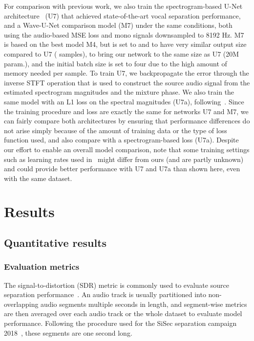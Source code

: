 \documentclass{article}
\begin{document}
For comparison with previous work, we also train the spectrogram-based U-Net architecture~\cite{Jansson2017} (U7) that achieved state-of-the-art vocal separation performance, and a Wave-U-Net comparison model (M7) under the same conditions, both using the audio-based MSE loss and mono signals downsampled to 8192 Hz.
M7 is based on the best model M4, but is set to  and  to have very similar output size compared to U7 ( samples),  to bring our network to the same size as U7 (20M param.), and the initial batch size is set to four due to the high amount of memory needed per sample.
To train U7, we backpropagate the error through the inverse STFT operation that is used to construct the source audio signal from the estimated spectrogram magnitudes and the mixture phase.
We also train the same model with an L1 loss on the spectral magnitudes (U7a), following~\cite{Jansson2017}.
Since the training procedure and loss are exactly the same for networks U7 and M7, we can fairly compare both architectures by ensuring that performance differences do not arise simply because of the amount of training data or the type of loss function used, and also compare with a spectrogram-based loss (U7a).
Despite our effort to enable an overall model comparison, note that some training settings such as learning rates used in~\cite{Jansson2017} might differ from ours (and are partly unknown) and could provide better performance with U7 and U7a than shown here, even with the same dataset.

\section{Results}
\label{sec:results}

\subsection{Quantitative results}
\label{sec:results_quantitative}

\subsubsection{Evaluation metrics}

The signal-to-distortion (SDR) metric is commonly used to evaluate source separation performance~\cite{Vincent2006}.
An audio track is usually partitioned into non-overlapping audio segments multiple seconds in length, and segment-wise metrics are then averaged over each audio track or the whole dataset to evaluate model performance.
Following the procedure used for the SiSec separation campaign 2018~\cite{Rafii2017}, these segments are one second long.
\end{document}
